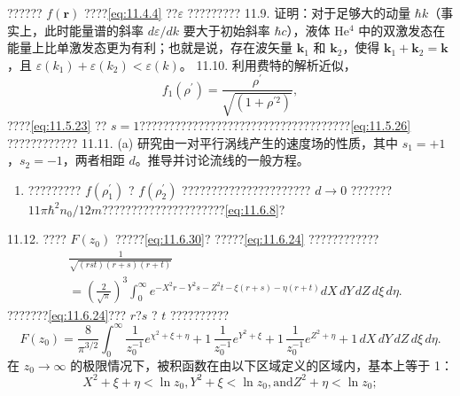 ?????? \(f(\mathbf{r})\) ????\autoref{eq:11.4.4} ??\(\varepsilon\) ?????????
11.9. 证明：对于足够大的动量 \(\hbar k\)（事实上，此时能量谱的斜率 \(d\varepsilon/dk\) 要大于初始斜率 \(\hbar c\)），液体 He\(^{4}\) 中的双激发态在能量上比单激发态更为有利；也就是说，存在波矢量 \(\boldsymbol{k}_{1}\) 和 \(\boldsymbol{k}_{2}\)，使得 \(\boldsymbol{k}_{1}+\boldsymbol{k}_{2}=\boldsymbol{k}\)，且 \(\varepsilon(k_{1})+\varepsilon(k_{2})<\varepsilon(k)\)。
11.10. 利用费特的解析近似，
\begin{equation}\tag{11.6.96}\label{eq:11.6.96}
f _ { 1 } ( \rho ^{\prime} ) = \frac { \rho ^{\prime} } { \sqrt { ( 1 + \rho ^{\prime 2} ) } } ,
\end{equation}
????\autoref{eq:11.5.23} ?? \(s=1\)????????????????????????????????????\autoref{eq:11.5.26} ????????????
11.11. (a) 研究由一对平行涡线产生的速度场的性质，其中 \(s_{1}=+1\)，\(s_{2}=-1\)，两者相距 \(d\)。推导并讨论流线的一般方程。
\begin{enumerate}
\def\labelenumi{(\alph{enumi})}
\setcounter{enumi}{1}
\item
  ????????? \(f(\rho_{1}^{\prime})\) ? \(f(\rho_{2}^{\prime})\) ?????????????????????? \(d\rightarrow0\) ??????? \(11\pi\hbar^{2}n_{0}/12m\)?????????????????????\autoref{eq:11.6.8}?
\end{enumerate}
11.12. ???? \(F(z_0)\) ?????\autoref{eq:11.6.30}?
?????\autoref{eq:11.6.24} ????????????
\begin{equation}\tag{11.6.97}\label{eq:11.6.97}
\begin{array}{rl} & { \frac { 1 } { \sqrt { ( r s t ) ( r + s ) ( r + t ) } } } \\& { = \left( \frac { 2 } { \sqrt { \pi } } \right) ^{3} \int _ { 0 } ^{\infty} e ^{- X ^ { 2} r - Y ^{2} s - Z ^{2} t - \xi ( r + s ) - \eta ( r + t ) } d X \, d Y \, d Z \, d \xi \, d \eta . } \end{array}
\end{equation}
???????\autoref{eq:11.6.24}??? \(r\)?\(s\) ? \(t\) ??????????
\begin{equation}\tag{11.6.98}\label{eq:11.6.98}
F ( z _ { 0 } ) = \frac { 8 } { \pi ^{3 / 2} } \int _ { 0 } ^{\infty} \frac { 1 } { z _ { 0 } ^{- 1} } e ^{\chi ^ { 2} + \xi + \eta } + 1 \, \frac { 1 } { z _ { 0 } ^{- 1} } e ^{Y ^ { 2} + \xi } + 1 \, \frac { 1 } { z _ { 0 } ^{- 1} } e ^{Z ^ { 2} + \eta } + 1 \, d X \, d Y \, d Z \, d \xi \, d \eta .
\end{equation}
在 \(z_{0} \rightarrow \infty\) 的极限情况下，被积函数在由以下区域定义的区域内，基本上等于 1：
\begin{equation}\tag{11.6.99}\label{eq:11.6.99}
X ^{2} + \xi + \eta < \ln z _ { 0 } ,  Y ^{2} + \xi < \ln z _ { 0 } ,  \mathrm { a n d }  Z ^{2} + \eta < \ln z _ { 0 } ;
\end{equation}
